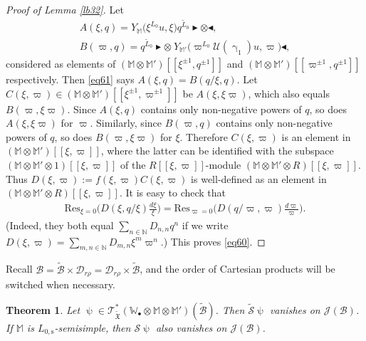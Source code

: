 \documentclass[12pt,a4paper,notitlepage]{article}
\theoremstyle{definition}
\theoremstyle{plain}
\newtheorem{thm}[df]{Theorem}
\newcommand{\fk}{\mathfrak}
\newcommand{\mc}{\mathcal}
\newcommand{\wtd}{\widetilde}
\newcommand{\Res}{\mathrm{Res}}
\newcommand{\scr}{\mathscr}
\newcommand{\blt}{\bullet}
\newcommand{\Wbb}{\mathbb W}
\newcommand{\Mbb}{\mathbb M}
\newcommand{\Nbb}{\mathbb N}
\newcommand{\btl}{\blacktriangleleft}
\newcommand{\btr}{\blacktriangleright}
\newcommand{\Lss}{L_{0,\mathrm{s}}}
\numberwithin{equation}{section}
\begin{document}
\begin{proof}[Proof of Lemma \ref{lb32}]
	Let 
	\begin{gather*}
	A(\xi,q)=Y_{\Mbb}\big(\xi^{L_0}u,\xi\big)q^{\wtd L_0}\btr\otimes\btl,\\
	B(\varpi,q)=q^{\wtd L_0}\btr\otimes~Y_{\Mbb'}\big(\varpi^{L_0}\mc U(\upgamma_1)u,\varpi\big)\btl,
	\end{gather*}
	considered as elements of $(\Mbb\otimes\Mbb')[[\xi^{\pm1},q^{\pm 1}]]$ and $(\Mbb\otimes\Mbb')[[\varpi^{\pm1},q^{\pm 1}]]$ respectively. Then \eqref{eq61} says $A(\xi,q)=B(q/\xi,q)$. Let $C(\xi,\varpi)\in(\Mbb\otimes\Mbb')[[\xi^{\pm 1},\varpi^{\pm1}]]$  be $A(\xi,\xi\varpi)$, which also equals $B(\varpi,\xi\varpi)$. Since $A(\xi,q)$ contains only non-negative  powers of $q$, so does $A(\xi,\xi\varpi)$ for $\varpi$.   Similarly, since $B(\varpi,q)$ contains only non-negative powers of $q$, so does $B(\varpi,\xi\varpi)$ for $\xi$. Therefore $C(\xi,\varpi)$ is an element in  $(\Mbb\otimes\Mbb')[[\xi,\varpi]]$, where the latter  can be identified with the subspace $(\Mbb\otimes\Mbb'\otimes 1)[[\xi,\varpi]]$ of the $R[[\xi,\varpi]]$-module $(\Mbb\otimes\Mbb'\otimes R)[[\xi,\varpi]]$. Thus $D(\xi,\varpi):=f(\xi,\varpi)C(\xi,\varpi)$ is well-defined as an element in $(\Mbb\otimes\Mbb'\otimes R)[[\xi,\varpi]]$. It is easy to check that
	\begin{align*}
	\Res_{\xi=0}\bigg(D(\xi,q/\xi)\frac{d\xi}{\xi}\bigg)=\Res_{\varpi=0}\bigg(D(q/\varpi,\varpi)\frac{d\varpi}{\varpi}\bigg).
	\end{align*}
	(Indeed, they both equal $\sum_{n\in\Nbb}D_{n,n}q^n$ if we write $D(\xi,\varpi)=\sum_{m,n\in\Nbb}D_{m,n}\xi^m\varpi^n$.) This proves \eqref{eq60}.
\end{proof}




Recall $\mc B=\wtd{\mc B}\times\mc D_{r\rho}=\mc D_{r\rho}\times\wtd{\mc B}$, and the order of Cartesian products will be switched when necessary.

\begin{thm}\label{lb34}
	Let $\uppsi\in\scr T_{\wtd{\fk X}}^*(\Wbb_\blt\otimes\Mbb\otimes\Mbb')(\wtd{\mc B})$. Then $\wtd{\mc S}\uppsi$ vanishes on $\scr J(\mc B)$. If $\Mbb$ is  $\Lss$-semisimple, then  $\mc S\uppsi$ also vanishes on $\scr J(\mc B)$.
\end{thm}
\end{document}
